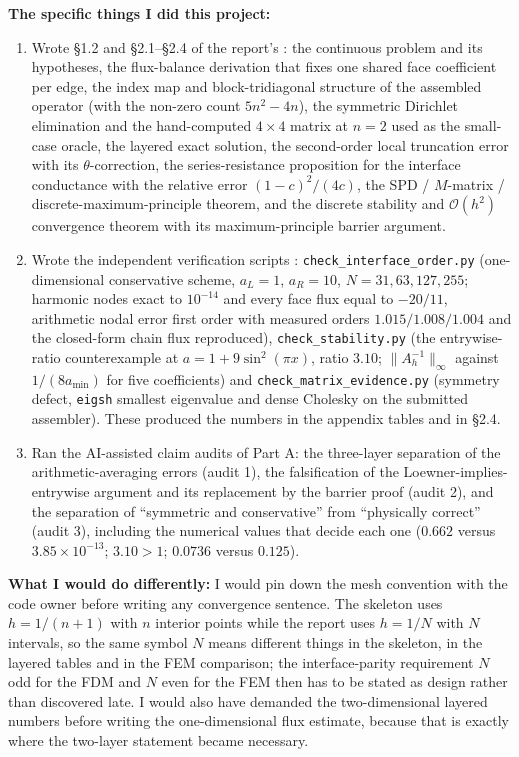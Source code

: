 \begin{formbox}
\textbf{The specific things I did this project:}
\begin{enumerate}[leftmargin=1.4em,itemsep=0.15em]
  \item
  Wrote \S1.2 and \S2.1--\S2.4 of the report's : the continuous
  problem and its hypotheses, the flux-balance derivation that fixes
  one shared face coefficient per edge, the index map and block-tridiagonal
  structure of the assembled operator (with the non-zero count $5n^2-4n$), the
  symmetric Dirichlet elimination and the hand-computed $4\times4$ matrix at
  $n=2$ used as the small-case oracle, the layered exact solution, the
  second-order local truncation error with its $\theta$-correction, the
  series-resistance proposition for the interface conductance with the relative
  error $(1-c)^2/(4c)$, the SPD / $M$-matrix / discrete-maximum-principle
  theorem, and the discrete stability and $\mathcal{O}(h^2)$ convergence theorem
  with its maximum-principle barrier argument.
  \item
  Wrote the independent verification scripts :
  \texttt{check\_interface\_order.py} (one-dimensional conservative scheme,
  $a_L=1$, $a_R=10$, $N=31,63,127,255$; harmonic nodes exact to $10^{-14}$ and
  every face flux equal to $-20/11$, arithmetic nodal error first order with
  measured orders $1.015/1.008/1.004$ and the closed-form chain flux
  reproduced), \texttt{check\_stability.py} (the entrywise-ratio counterexample
  at $a=1+9\sin^2(\pi x)$, ratio $3.10$; $\|A_h^{-1}\|_\infty$ against
  $1/(8a_{\min})$ for five coefficients) and
  \texttt{check\_matrix\_evidence.py} (symmetry defect, \texttt{eigsh} smallest
  eigenvalue and dense Cholesky on the submitted assembler). These produced the
  numbers in the appendix tables and in \S2.4.
  \item
  Ran the AI-assisted claim audits of Part A: the three-layer separation of the
  arithmetic-averaging errors (audit 1), the falsification of the
  Loewner-implies-entrywise argument and its replacement by the barrier proof
  (audit 2), and the separation of ``symmetric and conservative'' from
  ``physically correct'' (audit 3), including the numerical values that decide
  each one ($0.662$ versus $3.85\times10^{-13}$; $3.10>1$; $0.0736$ versus
  $0.125$).
\end{enumerate}

\textbf{What I would do differently:}
I would pin down the mesh convention with the code owner before writing any
convergence sentence. The skeleton uses $h=1/(n+1)$ with $n$ interior points
while the report uses $h=1/N$ with $N$ intervals, so the same symbol $N$ means
different things in the skeleton, in the layered tables and in the FEM
comparison; the interface-parity requirement $N$ odd for the FDM and $N$ even
for the FEM then has to be stated as design rather than discovered late. I would
also have demanded the two-dimensional layered numbers before writing the
one-dimensional flux estimate, because that is exactly where the two-layer
statement became necessary.


\end{formbox}
